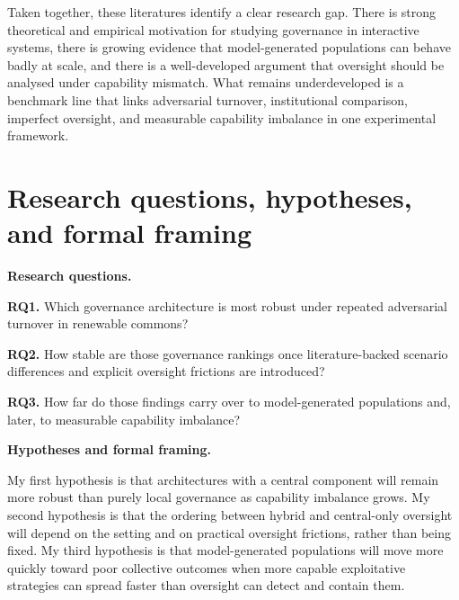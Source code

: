\documentclass[10pt]{article}
\begin{document}
Taken together, these literatures identify a clear research gap. There is strong theoretical and empirical motivation for studying governance in interactive systems, there is growing evidence that model-generated populations can behave badly at scale, and there is a well-developed argument that oversight should be analysed under capability mismatch. What remains underdeveloped is a benchmark line that links adversarial turnover, institutional comparison, imperfect oversight, and measurable capability imbalance in one experimental framework.

\section{Research questions, hypotheses, and formal framing}

\textbf{Research questions.}

\textbf{RQ1.} Which governance architecture is most robust under repeated adversarial turnover in renewable commons?

\textbf{RQ2.} How stable are those governance rankings once literature-backed scenario differences and explicit oversight frictions are introduced?

\textbf{RQ3.} How far do those findings carry over to model-generated populations and, later, to measurable capability imbalance?

\textbf{Hypotheses and formal framing.}

My first hypothesis is that architectures with a central component will remain more robust than purely local governance as capability imbalance grows. My second hypothesis is that the ordering between hybrid and central-only oversight will depend on the setting and on practical oversight frictions, rather than being fixed. My third hypothesis is that model-generated populations will move more quickly toward poor collective outcomes when more capable exploitative strategies can spread faster than oversight can detect and contain them.
\end{document}
